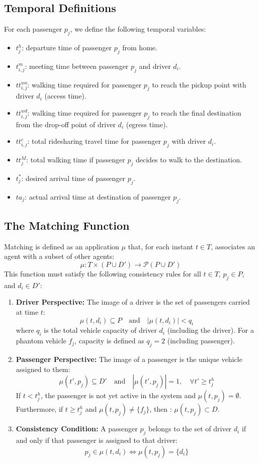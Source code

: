 \documentclass[11pt,a4paper]{article}
\begin{document}
\subsection{Temporal Definitions}
For each passenger $p_j$, we define the following temporal variables:
\begin{itemize}
    \item $t^h_j$: departure time of passenger $p_j$ from home.
    \item $t^m_{i,j}$: meeting time between passenger $p_j$ and driver $d_i$.
    \item $tt^{wo}_{i,j}$: walking time required for passenger $p_j$ to reach the pickup point with driver $d_i$ (access time).
    \item $tt^{wd}_{i,j}$: walking time required for passenger $p_j$ to reach the final destination from the drop-off point of driver $d_i$ (egress time).
    \item $tt^c_{i,j}$: total ridesharing travel time for passenger $p_j$ with driver $d_i$.
    \item $tt^M_j$: total walking time if passenger $p_j$ decides to walk to the destination.
    \item $t^*_j$: desired arrival time of passenger $p_j$.
    \item $ta_j$: actual arrival time at destination of passenger $p_j$.
\end{itemize}

\subsection{The Matching Function}
Matching is defined as an application $\mu$ that, for each instant $t \in T$, associates an agent with a subset of other agents:
\[ \mu : T \times (P \cup D') \to \mathcal{P}(P \cup D') \]
This function must satisfy the following consistency rules for all $t \in T$, $p_j \in P$, and $d_i \in D'$:
\begin{enumerate}
    \item \textbf{Driver Perspective:} The image of a driver is the set of passengers carried at time $t$:
    \[ \mu(t, d_i) \subseteq P \quad \text{and} \quad |\mu(t, d_i)| < q_i \]
		where $q_i$ is the total vehicle capacity of driver $d_i$ (including the driver). For a phantom vehicle $f_j$, capacity is defined as $q_j = 2$ (including passenger).
    \item \textbf{Passenger Perspective:} The image of a passenger is the unique vehicle assigned to them:
    \[ \mu(t', p_j) \subseteq D' \quad \text{and} \quad |\mu(t', p_j)| = 1, \quad \forall t' \geq t^h_j \]
    If $t < t^h_j$, the passenger is not yet active in the system and $\mu(t, p_j) = \emptyset$.
		Furthermore, if $t \geq t^h_j$ and $\mu(t, p_j) \neq \{f_j\}$, then : $\mu(t, p_j) \subset D$.
    \item \textbf{Consistency Condition:} A passenger $p_j$ belongs to the set of driver $d_i$ if and only if that passenger is assigned to that driver:
    \[ p_j \in \mu(t, d_i) \iff \mu(t, p_j) = \{d_i\} \]
\end{enumerate}
\end{document}
